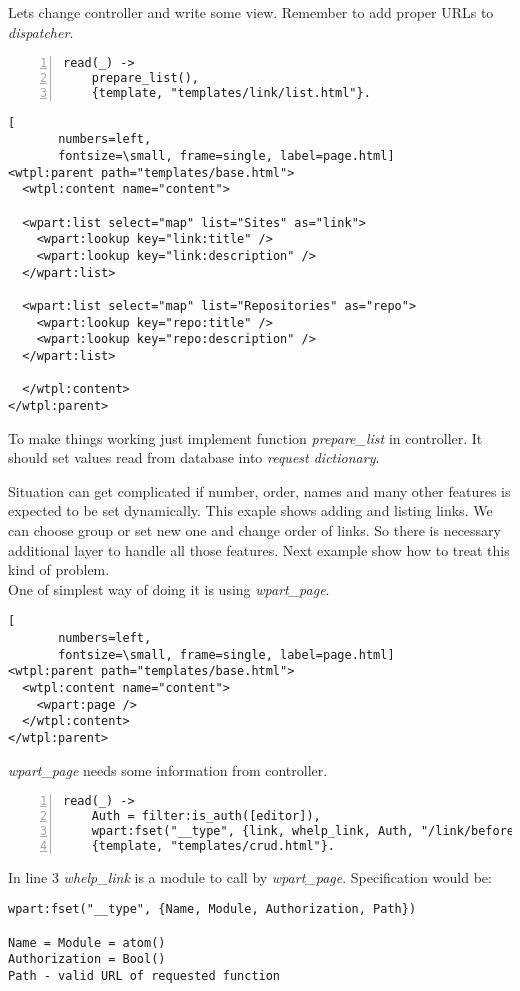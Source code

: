 Lets change controller and write some view. Remember to add proper URLs to \emph{dispatcher}.

\begin{Verbatim}[frame=single,
       framesep=2mm, numbers=left,
       label=link.erl,labelposition=topline,
       fontsize=\small]
read(_) ->
    prepare_list(),
    {template, "templates/link/list.html"}.
\end{Verbatim}

\begin{Verbatim}[  
       numbers=left,
       fontsize=\small, frame=single, label=page.html]
<wtpl:parent path="templates/base.html">
  <wtpl:content name="content">
  
  <wpart:list select="map" list="Sites" as="link">
    <wpart:lookup key="link:title" />
    <wpart:lookup key="link:description" />
  </wpart:list>

  <wpart:list select="map" list="Repositories" as="repo">
    <wpart:lookup key="repo:title" />
    <wpart:lookup key="repo:description" />
  </wpart:list>

  </wtpl:content>
</wtpl:parent>
\end{Verbatim}
To make things working just implement function \emph{prepare\_list} in controller. It should
set values read from database into \emph{request dictionary}.

Situation can get complicated if number, order, names and many other features
is expected to be set dynamically. This exaple shows adding and listing links. We can
choose group or set new one and change order of links. So there is necessary
additional layer to handle all those features. Next example show how to treat
this kind of problem. 
\\
One of simplest way of doing it is using \emph{wpart\_page}. 
\begin{Verbatim}[  
       numbers=left,
       fontsize=\small, frame=single, label=page.html]
<wtpl:parent path="templates/base.html">
  <wtpl:content name="content">
    <wpart:page />
  </wtpl:content>
</wtpl:parent>
\end{Verbatim}

{\it wpart\_page} needs some information from controller.
\\
\begin{Verbatim}[frame=single,
       framesep=2mm, numbers=left,
       label=link.erl,labelposition=topline,
       fontsize=\small]
read(_) ->
    Auth = filter:is_auth([editor]),
    wpart:fset("__type", {link, whelp_link, Auth, "/link/before_create"}),
    {template, "templates/crud.html"}.
\end{Verbatim}
In line 3 \emph{whelp\_link} is a module to call by \emph{wpart\_page}.
Specification would be:
\begin{verbatim}
wpart:fset("__type", {Name, Module, Authorization, Path})

Name = Module = atom()
Authorization = Bool()
Path - valid URL of requested function
\end{verbatim}

